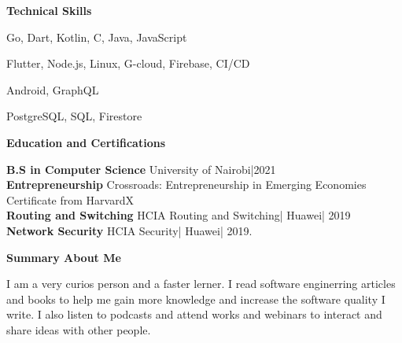 \documentclass[a4paper]{article}
\begin{document}
\begin{center}
    {\Large \textbf{Technical Skills}}
\end{center}

\begin{description}[noitemsep]
    \item[Languages:] Go, Dart, Kotlin, C, Java, JavaScript
    \item[Platforms and tools:] Flutter, Node.js, Linux, G-cloud, Firebase, CI/CD
    \item[Frameworks:] Android, GraphQL
    \item[Databases:] PostgreSQL, SQL, Firestore
\end{description}

\begin{center}
    {\Large \textbf{Education and Certifications}}
\end{center}

\textbf{B.S in Computer Science} University of Nairobi|2021 \\
\textbf{Entrepreneurship} Crossroads: Entrepreneurship in Emerging Economies Certificate from HarvardX \\
\textbf{Routing and Switching} HCIA Routing and Switching| Huawei| 2019 \\
\textbf{Network Security} HCIA Security| Huawei| 2019. \par

\begin{center}
    {\Large \textbf{Summary About Me} }
\end{center}

I am a very curios person and a faster lerner. I read software enginerring articles and books to help me gain more knowledge and increase the software quality I write. I also listen to podcasts and attend works and webinars to interact and share ideas with other people.

\end{document}
